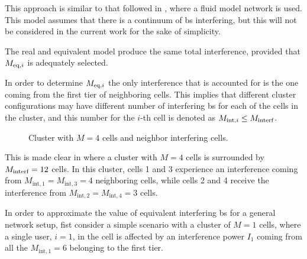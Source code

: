 This approach is similar to that followed in \cite{cheikh11}, where a fluid
model network is used. This model assumes that there is a continuum of \gls{bs}
interfering, but this will not be considered in the current work for the sake of
simplicity.

The real and equivalent model produce the same total interference, provided that
$M_{\text{eq},i}$ is adequately selected.

In order to determine $M_{\text{eq},i}$ the only interference that is accounted for is the
one coming from the first tier of neighboring cells. This implies that different
cluster configurations may have different number of interfering \gls{bs} for
each of the cells in the cluster, and this number for the $i$-th cell is denoted
as $M_{\text{int},i} \leq M_{\text{interf}}$.

\begin{figure}[t]
\begin{center}
    \hspace*{-8mm}
\end{center}
\caption{Cluster with $M=4$ cells and neighbor interfering cells.}
\label{fig:cluster_interf_cells}
\end{figure}

This is made clear in  where a cluster with
$M = 4$ cells is surrounded by $M_{\text{interf}} = 12$ cells. In this cluster, cells 1
and 3 experience an interference coming from $M_{\text{int}, 1} =
M_{\text{int}, 3} = 4$ neighboring cells, while cells 2 and 4 receive the
interference from $M_{\text{int}, 2} = M_{\text{int}, 4} = 3$ cells.

In order to approximate the value of equivalent interfering \gls{bs} for a
general network setup, fist consider a simple scenario  with
a cluster of $M = 1$ cells, where a single user, $i = 1$, in the cell is
affected by an interference power $I_1$ coming from all the
$M_{\text{int}, 1} = 6$ belonging to the first tier.

